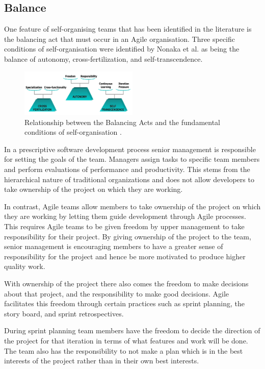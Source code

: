 \documentclass[conference]{IEEEtran}
\begin{document}
\subsection{Balance}

One feature of self-organising teams that has been identified in the literature
is the balancing act that must occur in an Agile organisation. Three specific
conditions of self-organisation were identified by Nonaka et al.
\cite{takeuchi1986new} as being the balance of autonomy, cross-fertilization,
and self-transcendence.

\begin{figure}[h!]   \centering
\includegraphics[width=0.5\textwidth]{balancing.png}   \caption{Relationship
between the Balancing Acts and the fundamental conditions of self-organisation
\cite{hoda2010balancing}.} \end{figure}

In a prescriptive software development process senior management is responsible
for setting the goals of the team. Managers assign tasks to specific team
members and perform evaluations of performance and productivity. This stems from
the hierarchical nature of traditional organizations and does not allow
developers to take ownership of the project on which they are working.

In contrast, Agile teams allow members to take ownership of the project on which
they are working by letting them guide development through Agile processes. This
requires Agile teams to be given freedom by upper management to take
responsibility for their project. By giving ownership of the project to the
team, senior management is encouraging members to have a greater sense of
responsibility for the project and hence be more motivated to produce higher
quality work.

With ownership of the project there also comes the freedom to make decisions
about that project, and the responsibility to make good decisions. Agile
facilitates this freedom through certain practices such as sprint planning,
the story board, and sprint retrospectives.

During sprint planning team members have the freedom to decide the direction of
the project for that iteration in terms of what features and work will be done.
The team also has the responsibility to not make a plan which is in the best
interests of the project rather than in their own best interests.
\end{document}
